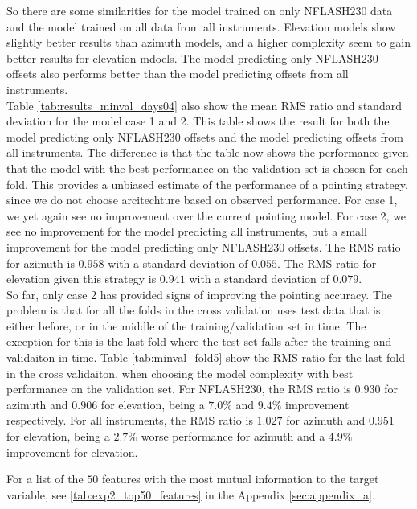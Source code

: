 So there are some similarities for the model trained on only NFLASH230 data and the model trained on all data from all instruments.
Elevation models show slightly better results than azimuth models, and a higher complexity seem to gain better results for elevation mdoels.
The model predicting only NFLASH230 offsets also performs better than the model predicting offsets from all instruments.\\

Table \ref{tab:results_minval_days04} also show the mean RMS ratio and standard deviation for the model case 1 and 2.
This table shows the result for both the model predicting only NFLASH230 offsets and the model predicting offsets from all instruments.
The difference is that the table now shows the performance given that the model with the best performance on the validation set is chosen for each fold.
This provides a unbiased estimate of the performance of a pointing strategy, since we do not choose arcitechture based on observed performance.
For case 1, we yet again see no improvement over the current pointing model. For case 2, we see no improvement for the model predicting all instruments,
but a small improvement for the model predicting only NFLASH230 offsets. The RMS ratio for azimuth is $0.958$ with a standard deviation of $0.055$.
The RMS ratio for elevation given this strategy is $0.941$ with a standard deviation of $0.079$.\\

So far, only case 2 has provided signs of improving the pointing accuracy.
The problem is that for all the folds in the cross validation uses test data that is either before, or in the middle of the training/validation set in time.
The exception for this is the last fold where the test set falls after the training and validaiton in time.
Table \ref{tab:minval_fold5} show the RMS ratio for the last fold in the cross validaiton,
when choosing the model complexity with best performance on the validation set.
For NFLASH230, the RMS ratio is $0.930$ for azimuth and $0.906$ for elevation, being a $7.0\%$ and $9.4\%$ improvement respectively.
For all instruments, the RMS ratio is $1.027$ for azimuth and $0.951$ for elevation, being a $2.7\%$ worse performance for azimuth and a $4.9\%$ improvement for elevation.

For a list of the $50$ features with the most mutual information to the target variable, see \ref{tab:exp2_top50_features} in the Appendix \ref{sec:appendix_a}.

